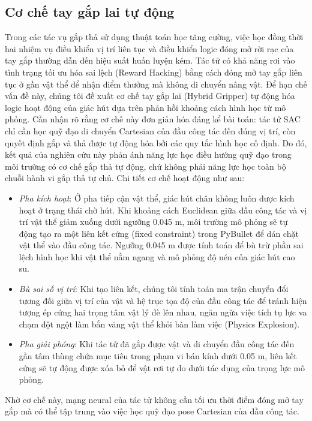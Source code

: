 \documentclass[conference]{IEEEtran}
\begin{document}
\subsection{Cơ chế tay gắp lai tự động}
Trong các tác vụ gắp thả sử dụng thuật toán học tăng cường, việc học đồng thời hai nhiệm vụ điều khiển vị trí liên tục và điều khiển logic đóng mở rời rạc của tay gắp thường dẫn đến hiệu suất huấn luyện kém. Tác tử có khả năng rơi vào tình trạng tối ưu hóa sai lệch (Reward Hacking) bằng cách đóng mở tay gắp liên tục ở gần vật thể để nhận điểm thưởng mà không di chuyển nâng vật. Để hạn chế vấn đề này, chúng tôi đề xuất cơ chế tay gắp lai (Hybrid Gripper) tự động hóa logic hoạt động của giác hút dựa trên phản hồi khoảng cách hình học từ mô phỏng. Cần nhận rõ rằng cơ chế này đơn giản hóa đáng kể bài toán: tác tử SAC chỉ cần học quỹ đạo di chuyển Cartesian của đầu công tác đến đúng vị trí, còn quyết định gắp và thả được tự động hóa bởi các quy tắc hình học cố định. Do đó, kết quả của nghiên cứu này phản ánh năng lực học điều hướng quỹ đạo trong môi trường có cơ chế gắp thả tự động, chứ không phải năng lực học toàn bộ chuỗi hành vi gắp thả tự chủ. Chi tiết cơ chế hoạt động như sau:
\begin{itemize}
    \item \textit{Pha kích hoạt}: Ở pha tiếp cận vật thể, giác hút chân không luôn được kích hoạt ở trạng thái chờ hút. Khi khoảng cách Euclidean giữa đầu công tác và vị trí vật thể giảm xuống dưới ngưỡng 0.045 m, môi trường mô phỏng sẽ tự động tạo ra một liên kết cứng (fixed constraint) trong PyBullet để dán chặt vật thể vào đầu công tác. Ngưỡng 0.045 m được tính toán để bù trừ phần sai lệch hình học khi vật thể nằm ngang và mô phỏng độ nén của giác hút cao su.
    \item \textit{Bù sai số vị trí}: Khi tạo liên kết, chúng tôi tính toán ma trận chuyển đổi tương đối giữa vị trí của vật và hệ trục tọa độ của đầu công tác để tránh hiện tượng ép cứng hai trọng tâm vật lý đè lên nhau, ngăn ngừa việc tích tụ lực va chạm đột ngột làm bắn văng vật thể khỏi bàn làm việc (Physics Explosion).
    \item \textit{Pha giải phóng}: Khi tác tử đã gắp được vật và di chuyển đầu công tác đến gần tâm thùng chứa mục tiêu trong phạm vi bán kính dưới 0.05 m, liên kết cứng sẽ tự động được xóa bỏ để vật rơi tự do dưới tác dụng của trọng lực mô phỏng.
\end{itemize}
Nhờ cơ chế này, mạng neural của tác tử không cần tối ưu thời điểm đóng mở tay gắp mà có thể tập trung vào việc học quỹ đạo pose Cartesian của đầu công tác.
\end{document}
